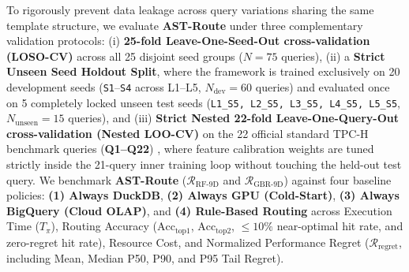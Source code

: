 \documentclass[10pt,a4paper]{article}
\begin{document}
To rigorously prevent data leakage across query variations sharing the same template structure, we evaluate \textbf{AST-Route} under three complementary validation protocols: (i) \textbf{25-fold Leave-One-Seed-Out cross-validation (LOSO-CV)} across all 25 disjoint seed groups ($N=75$ queries), (ii) a \textbf{Strict Unseen Seed Holdout Split}, where the framework is trained exclusively on 20 development seeds (\texttt{S1}--\texttt{S4} across L1--L5, $N_{\text{dev}}=60$ queries) and evaluated once on 5 completely locked unseen test seeds (\texttt{L1\_\allowbreak{}S5, L2\_\allowbreak{}S5, L3\_\allowbreak{}S5, L4\_\allowbreak{}S5, L5\_\allowbreak{}S5}, $N_{\text{unseen}}=15$ queries), and (iii) \textbf{Strict Nested 22-fold Leave-One-Query-Out cross-validation (Nested LOO-CV)} on the 22 official standard TPC-H benchmark queries (\textbf{Q1--Q22}) \cite{tpc2022tpch}, where feature calibration weights are tuned strictly inside the 21-query inner training loop without touching the held-out test query. We benchmark \textbf{AST-Route} ($\mathcal{R}_{\text{RF-9D}}$ and $\mathcal{R}_{\text{GBR-9D}}$) against four baseline policies: \textbf{(1) Always DuckDB}, \textbf{(2) Always GPU (Cold-Start)}, \textbf{(3) Always BigQuery (Cloud OLAP)}, and \textbf{(4) Rule-Based Routing} across Execution Time ($T_{\pi}$), Routing Accuracy ($\text{Acc}_{\text{top1}}$, $\text{Acc}_{\text{top2}}$, $\le 10\%$ near-optimal hit rate, and zero-regret hit rate), Resource Cost, and Normalized Performance Regret ($\mathcal{R}_{\text{regret}}$, including Mean, Median P50, P90, and P95 Tail Regret).
\end{document}
